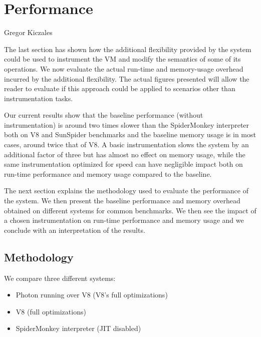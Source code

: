 \chapter{Performance}
{Gregor Kiczales~\cite{Kiczales92towardsa}}

\label{chap:Performance}

The last section has shown how the additional flexibility provided by the
system could be used to instrument the VM and modify the semantics of some of
its operations. We now evaluate the actual run-time and memory-usage overhead
incurred by the additional flexibility. The actual figures presented will allow
the reader to evaluate if this approach could be applied to scenarios other
than instrumentation tasks.

Our current results show that the baseline performance (without
instrumentation) is around two times slower than the SpiderMonkey interpreter
both on V8 and SunSpider benchmarks and the baseline memory usage is in most
cases, around twice that of V8. A basic instrumentation slows the system by an
additional factor of three but has almost no effect on memory usage, while the
same instrumentation optimized for speed can have negligible impact both on
run-time performance and memory usage compared to the baseline.

The next section explains the methodology used to evaluate the performance of
the system. We then present the baseline performance and memory overhead
obtained on different systems for common benchmarks. We then see the impact of
a chosen instrumentation on run-time performance and memory usage and we
conclude with an interpretation of the results. 

\section{Methodology}

We compare three different systems:
\begin{itemize}
    \item Photon running over V8 (V8's full optimizations)
    \item V8 (full optimizations)
    \item SpiderMonkey interpreter (JIT disabled)
\end{itemize}

